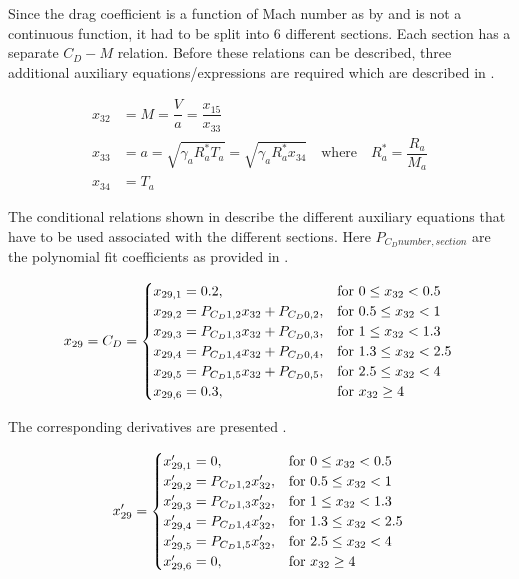 Since the drag coefficient is a function of Mach number as by  and is not a continuous function, it had to be split into 6 different sections. Each section has a separate $C_{D}-M$ relation. Before these relations can be described, three additional auxiliary equations/expressions are required which are described in .

 \begin{equation} \label{eq:cdAux}
\begin{split}
x_{32} &= M = \dfrac{V}{a} = \dfrac{x_{15}}{x_{33}}\\
x_{33} &= a = \sqrt{\gamma_{a}R_{a}^{*}T_{a}} = \sqrt{\gamma_{a}R_{a}^{*}x_{34}} \quad \text{where} \quad R_{a}^{*}=\dfrac{R_{a}}{M_{a}} \\
x_{34} &= T_{a}
\end{split}
\end{equation}

The conditional relations shown in  describe the different auxiliary equations that have to be used associated with the different sections. Here $P_{C_{D} number,section}$ are the polynomial fit coefficients as provided in .

\begin{equation}\label{eq:cdCond}
x_{29}=C_{D}=\begin{cases}
x_{29,1}=0.2, & \text{for } 0\leq x_{32} < 0.5\\
x_{29,2}=P_{C_{D} 1,2}x_{32}+P_{C_{D} 0,2}, &  \text{for } 0.5\leq x_{32} < 1 \\
x_{29,3}=P_{C_{D} 1,3}x_{32}+P_{C_{D} 0,3}, &  \text{for } 1\leq x_{32} < 1.3 \\
x_{29,4}=P_{C_{D} 1,4}x_{32}+P_{C_{D} 0,4}, &  \text{for } 1.3\leq x_{32} < 2.5 \\
x_{29,5}=P_{C_{D} 1,5}x_{32}+P_{C_{D} 0,5}, &  \text{for } 2.5\leq x_{32} < 4 \\
x_{29,6}=0.3, &  \text{for } x_{32} \geq 4 
\end{cases}\\
\end{equation}

The corresponding derivatives are presented .

\begin{equation}\label{eq:cdCondDer}
x'_{29}=\begin{cases}
x'_{29,1}=0, & \text{for } 0\leq x_{32} < 0.5\\
x'_{29,2}=P_{C_{D} 1,2}x'_{32}, &  \text{for } 0.5\leq x_{32} < 1 \\
x'_{29,3}=P_{C_{D} 1,3}x'_{32}, &  \text{for } 1\leq x_{32} < 1.3 \\
x'_{29,4}=P_{C_{D} 1,4}x'_{32}, &  \text{for } 1.3\leq x_{32} < 2.5 \\
x'_{29,5}=P_{C_{D} 1,5}x'_{32}, &  \text{for } 2.5\leq x_{32} < 4 \\
x'_{29,6}=0, &  \text{for } x_{32} \geq 4 
\end{cases}\\
\end{equation}

